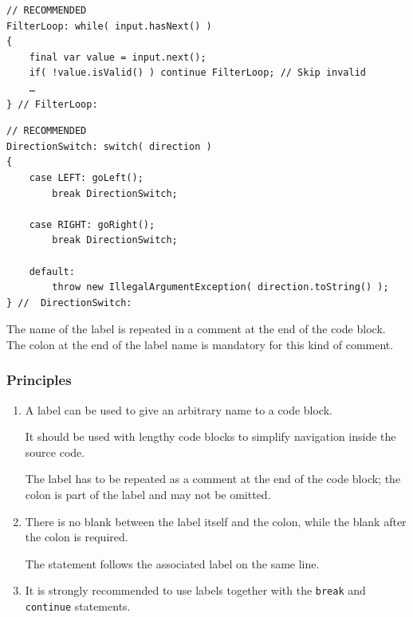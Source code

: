 \begin{lstlisting}
// RECOMMENDED
FilterLoop: while( input.hasNext() )
{
    final var value = input.next();
    if( !value.isValid() ) continue FilterLoop; // Skip invalid
    …
} // FilterLoop:
\end{lstlisting}

\begin{lstlisting}
// RECOMMENDED
DirectionSwitch: switch( direction )
{
    case LEFT: goLeft(); 
    	break DirectionSwitch;
    	
    case RIGHT: goRight(); 
    	break DirectionSwitch;
    	
    default:
        throw new IllegalArgumentException( direction.toString() );
} //  DirectionSwitch:
\end{lstlisting}

The name of the label is repeated in a comment at the end of the code block. The colon at the end of the label name is mandatory for this kind of comment.

\subsubsection{Principles}
\begin{enumerate}[label=P\arabic*.]
\item{A label can be used to give an arbitrary name to a code block.

It should be used with lengthy code blocks to simplify navigation inside the source code.

The label has to be repeated as a comment at the end of the code block; the colon is part of the label and may not be omitted.}
\item{There is no blank between the label itself and the colon, while the blank after the colon is required.

The statement follows the associated label on the same line.}
\item{It is strongly recommended to use labels together with the \lstinline|break| and \lstinline|continue| statements.}
\end{enumerate}

